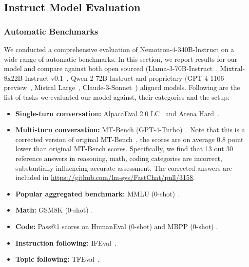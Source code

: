 \documentclass[11pt]{article}
\newcommand{\oursin}{Nemotron-4-340B-Instruct}
\begin{document}
\subsection{Instruct Model Evaluation}
\label{sec:chat-model-eval}
\subsubsection{Automatic Benchmarks}
\label{sec:chat-model-auto-eval}


We conducted a comprehensive evaluation of \oursin{} on a wide range of automatic benchmarks.
In this section, we report results for our model and compare against both open sourced (Llama-3-70B-Instruct~\citep{llama3}, Mixtral-8x22B-Instruct-v0.1~\citep{mixtral-8x22b}, Qwen-2-72B-Instruct \citep{qwen2} and proprietary (GPT-4-1106-preview~\citep{gpt-4-1106-preview}, Mistral Large~\citep{mistral-large}, Claude-3-Sonnet~\citep{anthropic2024claude}) aligned models.
Following are the list of tasks we evaluated our model against, their categories and the setup:
\begin{itemize}
    \item \textbf{Single-turn conversation:} AlpacaEval 2.0 LC~\citep{dubois2024length} and Arena Hard~\citep{li2024live}.
    \item \textbf{Multi-turn conversation:} MT-Bench (GPT-4-Turbo)~\citep{ helpsteer2}. Note that this is a corrected version of original MT-Bench~\citep{zheng2024judging}, the scores are on average 0.8 point lower than original MT-Bench scores. Specifically, we find that 13 out 30 reference answers in reasoning, math, coding categories are incorrect, substantially influencing accurate assessment. The corrected answers are included in \url{https://github.com/lm-sys/FastChat/pull/3158}.
    \item \textbf{Popular aggregated benchmark:} MMLU (0-shot) \citep{hendrycks2020measuring}.
    \item \textbf{Math:} GSM8K (0-shot) \citep{cobbe2021}.
    \item \textbf{Code:} Pass@1 scores on HumanEval (0-shot) \citep{chen2021evaluating} and MBPP (0-shot) \citep{austin2021program}.
    \item \textbf{Instruction following:} IFEval~\citep{zhou2023instruction}.
    \item \textbf{Topic following:} TFEval~\citep{topic_following_dataset}.
\end{itemize}
\end{document}
